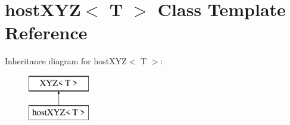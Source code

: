 \hypertarget{classhostXYZ}{}\section{host\+X\+YZ$<$ T $>$ Class Template Reference}
\label{classhostXYZ}
Inheritance diagram for host\+X\+YZ$<$ T $>$\+:\begin{figure}[H]
\begin{center}
\leavevmode
\includegraphics[height=2.000000cm]{classhostXYZ}
\end{center}
\end{figure}
